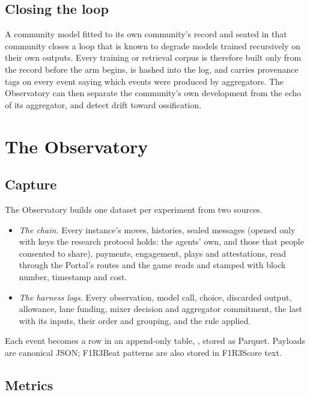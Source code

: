 \documentclass[11pt,a4paper]{article}
\begin{document}
\subsection{Closing the loop}

A community model fitted to its own community's record and seated in that community closes a loop
that is known to degrade models trained recursively on their own outputs. Every training or
retrieval corpus is therefore built only from the record before the arm begins, is hashed into the
log, and carries provenance tags on every event saying which events were produced by aggregators.
The Observatory can then separate the community's own development from the echo of its
aggregator, and detect drift toward ossification.

\section{The Observatory}\label{sec:observatory}

\subsection{Capture}

The Observatory builds one dataset per experiment from two sources.
\begin{itemize}[itemsep=2pt]
\item \emph{The chain.} Every instance's moves, histories, sealed messages (opened only with keys the
  research protocol holds: the agents' own, and those that people consented to share), payments,
  engagement, plays and attestations, read through the Portal's routes and the game reads and
  stamped with block number, timestamp and cost.
\item \emph{The harness logs.} Every observation, model call, choice, discarded output, allowance,
  lane funding, mixer decision and aggregator commitment, the last with its inputs, their order and
  grouping, and the rule applied.
\end{itemize}

Each event becomes a row in an append-only table, , stored as Parquet. Payloads are canonical
JSON; F1R3Beat patterns are also stored in F1R3Score text.

\subsection{Metrics}
\end{document}
